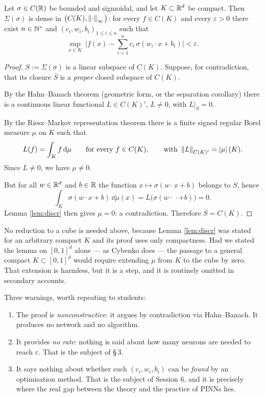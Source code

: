 \documentclass[11pt,a4paper]{article}
\begin{document}
\begin{theorem}[Cybenko, 1989]\label{th:cybenko}
Let $\sigma \in C(\mathbb{R})$ be bounded and sigmoidal, and let $K \subset \mathbb{R}^d$ be compact. Then
$\Sigma(\sigma)$ is dense in $\big(C(K), \left\lVert \cdot \right\rVert_\infty\big)$: for every $f \in C(K)$ and every
$\varepsilon > 0$ there exist $n \in \mathbb{N}^*$ and $(c_i, w_i, b_i)_{1 \le i \le n}$ such that
\[
\sup_{x \in K}\ \Big| f(x) - \sum_{i=1}^n c_i \,\sigma(w_i \cdot x + b_i)\Big| < \varepsilon .
\]
\end{theorem}

\begin{proof}
$S := \Sigma(\sigma)$ is a linear subspace of $C(K)$. Suppose, for contradiction, that its closure
$\overline{S}$ is a \emph{proper} closed subspace of $C(K)$.

By the Hahn--Banach theorem (geometric form, or the separation corollary) there is a continuous
linear functional $L \in C(K)'$, $L \ne 0$, with $L|_{\overline{S}} = 0$.

By the Riesz--Markov representation theorem there is a finite signed regular Borel measure $\mu$ on
$K$ such that
\[
L(f) = \int_K f \,\mathrm{d} \mu \qquad \text{for every } f \in C(K),
\qquad \text{with } \left\lVert L \right\rVert_{C(K)'} = \left\lvert \mu \right\rvert(K) .
\]
Since $L \ne 0$, we have $\mu \ne 0$.

But for all $w \in \mathbb{R}^d$ and $b \in \mathbb{R}$ the function $x \mapsto \sigma(w\cdot x + b)$ belongs to
$S$, hence
\[
\int_K \sigma(w\cdot x + b)\,\dd\mu(x) = L\big(\sigma(w\cdot\, \cdot + b)\big) = 0 .
\]
Lemma \ref{lem:discr} then gives $\mu = 0$: a contradiction. Therefore $\overline{S} = C(K)$.
\end{proof}

\begin{remark}
No reduction to a cube is needed above, because Lemma \ref{lem:discr} was stated for an arbitrary
compact $K$ and its proof uses only compactness. Had we stated the lemma on $[0,1]^d$ alone --- as
Cybenko does --- the passage to a general compact $K \subset [0,1]^d$ would require extending $\mu$
from $K$ to the cube by zero. That extension is harmless, but it is a step, and it is routinely
omitted in secondary accounts.
\end{remark}

\begin{remark}\label{rem:cybenko-limits}
Three warnings, worth repeating to students:
\begin{enumerate}[label=(\alph*)]
\item The proof is \emph{nonconstructive}: it argues by contradiction via Hahn--Banach. It produces
no network and no algorithm.
\item It provides \emph{no rate}: nothing is said about how many neurons are needed to reach
$\varepsilon$. That is the subject of §\,3.
\item It says nothing about whether such $(c_i,w_i,b_i)$ can be \emph{found} by an optimisation
method. That is the subject of Session 6, and it is precisely where the real gap between the theory
and the practice of PINNs lies.
\end{enumerate}
\end{remark}
\end{document}
